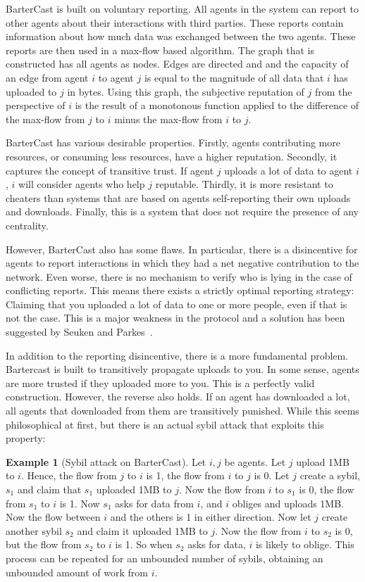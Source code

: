 \documentclass[a4paper,11pt]{book}
\theoremstyle{definition}
\newtheorem*{example}{Example}
\begin{document}
BarterCast is built on voluntary reporting. All agents in the system can report to other agents
about their interactions with third parties. These reports contain information about how much data
was exchanged between the two agents. These reports are then used in a max-flow based algorithm.
The graph that is constructed has all agents as nodes. Edges are directed and and the capacity
of an edge from agent $i$ to agent $j$ is equal to the magnitude of all data that $i$ has
uploaded to $j$ in bytes. Using this graph, the subjective reputation of $j$ from the perspective
of $i$ is the result of a monotonous function applied to the difference of the max-flow from $j$ to $i$
minus the max-flow from $i$ to $j$.

BarterCast has various desirable properties. Firstly, agents contributing more resources, or consuming
less resources, have a higher reputation. Secondly, it captures the concept of transitive trust. If agent
$j$ uploads a lot of data to agent $i$, $i$ will consider agents who help $j$ reputable. Thirdly,
it is more resistant to cheaters than systems that are based on agents self-reporting their own uploads and
downloads. Finally, this is a system that does not require the presence of any centrality. 

However, BarterCast also has some flaws. In particular, there is a disincentive for agents to report
interactions in which they had a net negative contribution to the network. Even worse, there is no mechanism
to verify who is lying in the case of conflicting reports. This means there exists a strictly optimal 
reporting strategy: Claiming that you uploaded a lot of data to one or more people, even if that is not
the case. This is a major weakness in the protocol and a solution has been suggested by Seuken and 
Parkes~\cite{seuken2010accounting}. 

In addition to the reporting disincentive, there is a more fundamental problem. Bartercast is built
to transitively propagate uploads to you. In some sense, agents are more trusted if they uploaded
more to you. This is a perfectly valid construction. However, the reverse also holds. If an agent
has downloaded a lot, all agents that downloaded from them are transitively punished. While
this seems philosophical at first, but there is an actual sybil
attack that exploits this property:

\begin{example}[Sybil attack on BarterCast]
     Let $i, j$ be agents. Let $j$ upload 1MB to $i$. Hence, the flow from $j$ to $i$ is 1, the flow
    from $i$ to $j$ is 0. Let $j$ create a sybil, $s_1$ and claim that $s_1$ uploaded 1MB to $j$.
    Now the flow from $i$ to $s_1$ is $0$, the flow from $s_1$ to $i$ is 1. Now $s_1$ asks
    for data from $i$, and $i$ obliges and uploads 1MB. Now the flow between $i$ and the others is
    1 in either direction. Now let $j$ create another sybil $s_2$ and claim it uploaded 1MB to $j$. 
    Now the flow from $i$ to $s_2$ is 0, but the flow from $s_2$ to $i$ is 1. 
    So when $s_2$ asks for data, $i$ is likely to oblige. This process can be repeated for an unbounded
    number of sybils, obtaining an unbounded amount of work from $i$.
\end{example}
\end{document}
